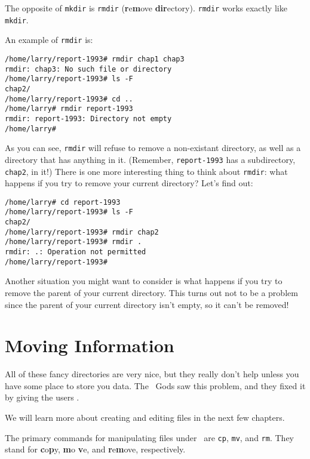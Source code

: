 The opposite of {\tt mkdir} is {\tt rmdir} ({\bf r}e{\bf m}ove {\bf
  dir}ectory).  {\tt rmdir} works exactly like {\tt mkdir}.

An example of {\tt rmdir} is:

\begin{screen}\begin{verbatim}
/home/larry/report-1993# rmdir chap1 chap3
rmdir: chap3: No such file or directory
/home/larry/report-1993# ls -F
chap2/
/home/larry/report-1993# cd ..
/home/larry# rmdir report-1993
rmdir: report-1993: Directory not empty
/home/larry#
\end{verbatim}\end{screen}

As you can see, {\tt rmdir} will refuse to remove a non-existant
directory, as well as a directory that has anything in it. (Remember,
{\tt report-1993} has a subdirectory, {\tt chap2}, in it!) There is
one more interesting thing to think about {\tt rmdir}: what happens if
you try to remove your current directory? Let's find out:

\begin{screen}\begin{verbatim}
/home/larry# cd report-1993
/home/larry/report-1993# ls -F
chap2/
/home/larry/report-1993# rmdir chap2
/home/larry/report-1993# rmdir .
rmdir: .: Operation not permitted
/home/larry/report-1993#
\end{verbatim}\end{screen}

Another situation you might want to consider is what happens if you try
to remove the parent of your current directory. This turns out not to
be a problem since the parent of your current directory isn't empty, so
it can't be removed!

\section{Moving Information}

All of these fancy directories are very nice, but they really don't
help unless you have some place to store you data.  The \unix\ 
Gods saw this problem, and they fixed it by giving
the users \concept{files}.



We will learn more about creating and editing files in the next few
chapters.

The primary commands for manipulating files under \unix\ are {\tt cp},
{\tt mv}, and {\tt rm}.  They stand for {\bf c}o{\bf p}y, {\bf m}o{\bf
  v}e, and {\bf r}e{\bf m}ove, respectively.

